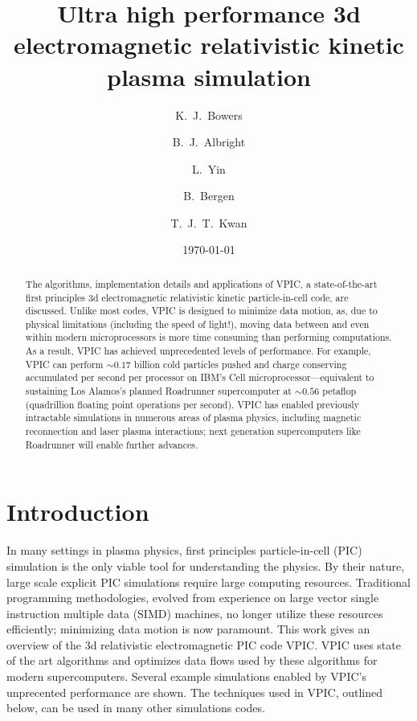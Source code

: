 \documentclass[aps,prl,preprint,preprintnumbers,groupedaddress]{revtex4}
\begin{document}

\title{Ultra high performance 3d electromagnetic relativistic kinetic plasma simulation}

\author{K.~J.~Bowers}
\author{B.~J.~Albright}
\author{L.~Yin}
\author{B.~Bergen}
\author{T.~J.~T.~Kwan}

\date{\today}

\begin{abstract}
The algorithms, implementation details and applications of VPIC, a
state-of-the-art first principles 3d electromagnetic relativistic
kinetic particle-in-cell code, are discussed.  Unlike most codes, VPIC
is designed to minimize data motion, as, due to physical limitations
(including the speed of light!), moving data between and even within
modern microprocessors is more time consuming than performing
computations.  As a result, VPIC has achieved unprecedented levels of
performance.  For example, VPIC can perform $\sim 0.17$ billion cold
particles pushed and charge conserving accumulated per second per
processor on IBM's Cell microprocessor---equivalent to sustaining Los
Alamos's planned Roadrunner supercomputer at $\sim 0.56$ petaflop
(quadrillion floating point operations per second).  VPIC has enabled
previously intractable simulations in numerous areas of plasma
physics, including magnetic reconnection and laser plasma
interactions; next generation supercomputers like Roadrunner will
enable further advances.
\end{abstract}

\maketitle

\section{Introduction}

In many settings in plasma physics, first principles particle-in-cell
(PIC) simulation \cite{Birdsall_Langdon_1985,Hockney_Eastwood_1988} is
the only viable tool for understanding the physics.  By their nature,
large scale explicit PIC simulations require large computing
resources.  Traditional programming methodologies, evolved from
experience on large vector single instruction multiple data (SIMD)
machines, no longer utilize these resources efficiently; minimizing
data motion is now paramount.  This work gives an overview of the 3d
relativistic electromagnetic PIC code VPIC.  VPIC uses state of the
art algorithms and optimizes data flows used by these algorithms
for modern supercomputers.  Several example simulations enabled by
VPIC's unprecented performance are shown.  The techniques used in
VPIC, outlined below, can be used in many other simulations codes.
\end{document}
